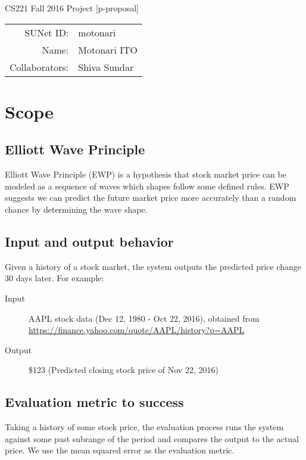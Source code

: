 \documentclass[12pt]{article}
\begin{document}
\begin{center}
{\Large CS221 Fall 2016 Project [p-proposal]}

\begin{tabular}{rl}
SUNet ID: & motonari \\
Name: & Motonari ITO \\
Collaborators: & Shiva Sundar
\end{tabular}
\end{center}

\section{Scope}

\subsection{Elliott Wave Principle}

Elliott Wave Principle (EWP) is a hypothesis that stock market price
can be modeled as a sequence of waves which shapes follow some defined
rules. EWP suggests we can predict the future market price more
accurately than a random chance by determining the wave shape.

\subsection{Input and output behavior}

Given a history of a stock market, the system outputs the predicted
price change 30 days later. For example:

\begin{description}
\item[Input] AAPL stock data (Dec 12, 1980 - Oct 22, 2016), obtained from \url{https://finance.yahoo.com/quote/AAPL/history?p=AAPL}
\item[Output] \$123 (Predicted closing stock price of Nov 22, 2016)
\end{description}

\subsection{Evaluation metric to success}

Taking a history of some stock price, the evaluation process runs the
system against some past subrange of the period and compares the
output to the actual price. We use the mean squared error as the
evaluation metric.
      
\end{document}
